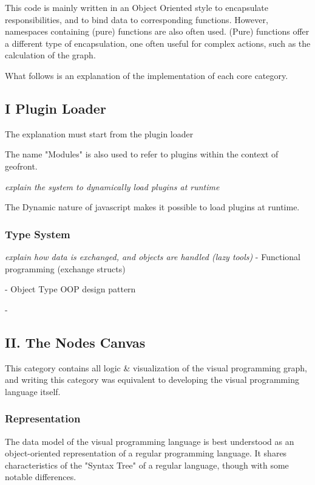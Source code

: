 This code is mainly written in an Object Oriented style to encapsulate responsibilities, and to bind data to corresponding functions. However, namespaces containing (pure) functions are also often used. (Pure) functions offer a different type of encapsulation, one often useful for complex actions, such as the calculation of the graph.

What follows is an explanation of the implementation of each core category.



\subsection{ I Plugin Loader } 

The explanation must start from the plugin loader 

The name "Modules" is also used to refer to plugins within the context of geofront.


\emph{explain the system to dynamically load plugins at runtime}

The Dynamic nature of javascript makes it possible to load plugins at runtime. 

\subsubsection{ Type System }

\emph{explain how data is exchanged, and objects are handled (lazy tools)}
- Functional programming (exchange structs)

- Object Type OOP design pattern



- 


\subsection*{ II. The Nodes Canvas }
This category contains all logic \& visualization of the visual programming graph, and writing this category was equivalent to developing the visual programming language itself.

\subsubsection*{Representation}
The data model of the visual programming language is best understood as an object-oriented representation of a regular programming language. It shares characteristics of the "Syntax Tree" of a regular language, though with some notable differences.

